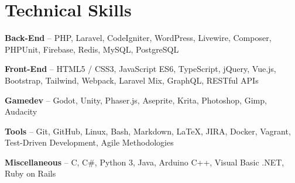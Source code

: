\section{Technical Skills}
\begin{small}
	\parbox[t][][t]{\linewidth}{
		\textbf{Back-End} -- PHP, Laravel, CodeIgniter, WordPress, Livewire, Composer, PHPUnit, Firebase, Redis, MySQL, PostgreSQL
		\smallbreak
	}
	\parbox[t][][t]{\linewidth}{
		\textbf{Front-End} -- HTML5 / CSS3, JavaScript ES6, TypeScript, jQuery, Vue.js, Bootstrap, Tailwind, Webpack, Laravel Mix, GraphQL, RESTful APIs
		\smallbreak
	}
	\parbox[t][][t]{\linewidth}{
		\textbf{Gamedev} -- Godot, Unity, Phaser.js, Aseprite, Krita, Photoshop, Gimp, Audacity
		\smallbreak
	}
	\parbox[t][][t]{\linewidth}{
		\textbf{Tools} -- Git, GitHub, Linux, Bash, Markdown, LaTeX, JIRA, Docker, Vagrant, Test-Driven Development, Agile Methodologies
		\smallbreak
	}
	\parbox[t][][t]{\linewidth}{
		\textbf{Miscellaneous} -- C, C\#, Python 3, Java, Arduino C++, Visual Basic .NET, Ruby on Rails
	}
\end{small}
